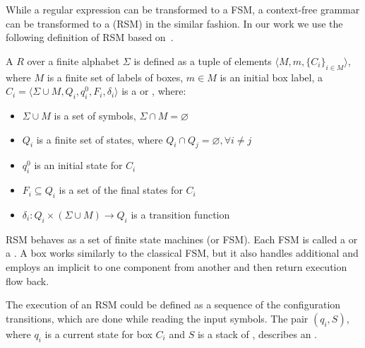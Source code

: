 
While a regular expression can be transformed to a FSM, a context-free grammar can be transformed to a  (RSM) in the similar fashion.
In our work we use the following definition of RSM based
on~\cite{rsm:analysis:10.1007/3-540-44585-4_18}.

\begin{definition}
A  $R$ over a finite alphabet $\Sigma$ is defined as a tuple of elements $\langle M,m,\{C_i\}_{i \in M} \rangle$, where $M$ is a finite set of labels of boxes,
$m \in M$ is an initial box label, a $C_i=\langle \Sigma \cup M, Q_i,q_i^0,F_i,\delta_i \rangle$ is a  or , where:
    \begin{itemize}
        \item $\Sigma \cup M$ is a set of symbols, $\Sigma \cap M = \varnothing$
        \item $Q_i$ is a finite set of states,
              where $Q_i \cap Q_j = \varnothing, \forall i \neq j$
        \item $q_i^0$ is an initial state for $C_i$
        \item $F_i \subseteq Q_i$ is a set of the final states for $C_i$
        \item $\delta_i: Q_i \times (\Sigma \cup M) \to Q_i$ is a transition function %
    \end{itemize}

\end{definition}

RSM behaves as a set of finite state machines (or FSM).
Each FSM is called a  or a .
A box works similarly to the classical FSM, but it also handles additional  and employs an implicit  to  one component from another and then return execution flow back.

The execution of an RSM could be defined as a sequence of the configuration transitions, which are done while reading the input symbols.
The pair $(q_i,S)$, where $q_i$ is a current state for box $C_i$ and $S$ is  a stack of , describes an .

